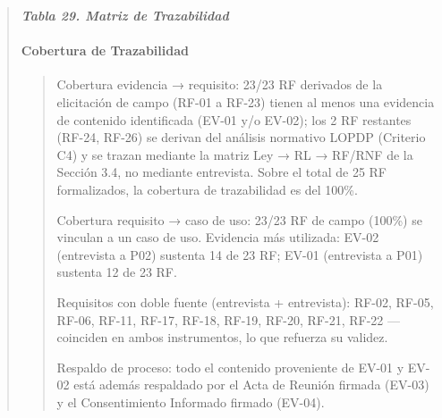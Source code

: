 \documentclass[
]{article}
\begin{document}
\begin{quote}
\protect{}\label{_bookmark113}{}\emph{\textbf{Tabla 29.
Matriz de Trazabilidad}}

\paragraph{Cobertura de Trazabilidad}\label{cobertura-de-trazabilidad}

\begin{quote}
Cobertura evidencia → requisito: 23/23 RF derivados de la elicitación de
campo (RF-01 a RF-23) tienen al menos una evidencia de contenido
identificada (EV-01 y/o EV-02); los 2 RF restantes (RF-24, RF-26) se
derivan del análisis normativo LOPDP (Criterio C4) y se trazan mediante
la matriz Ley → RL → RF/RNF de la Sección 3.4, no mediante entrevista.
Sobre el total de 25 RF formalizados, la cobertura de trazabilidad es
del 100\%.

Cobertura requisito → caso de uso: 23/23 RF de campo (100\%) se vinculan
a un caso de uso. Evidencia más utilizada: EV-02 (entrevista a P02)
sustenta 14 de 23 RF; EV-01 (entrevista a P01) sustenta 12 de 23 RF.

Requisitos con doble fuente (entrevista + entrevista): RF-02, RF-05,
RF-06, RF-11, RF-17, RF-18, RF-19, RF-20, RF-21, RF-22 --- coinciden en
ambos instrumentos, lo que refuerza su validez.

Respaldo de proceso: todo el contenido proveniente de EV-01 y EV-02 está
además respaldado por el Acta de Reunión firmada (EV-03) y el
Consentimiento Informado firmado (EV-04).
\end{quote}




\end{quote}
\end{document}
